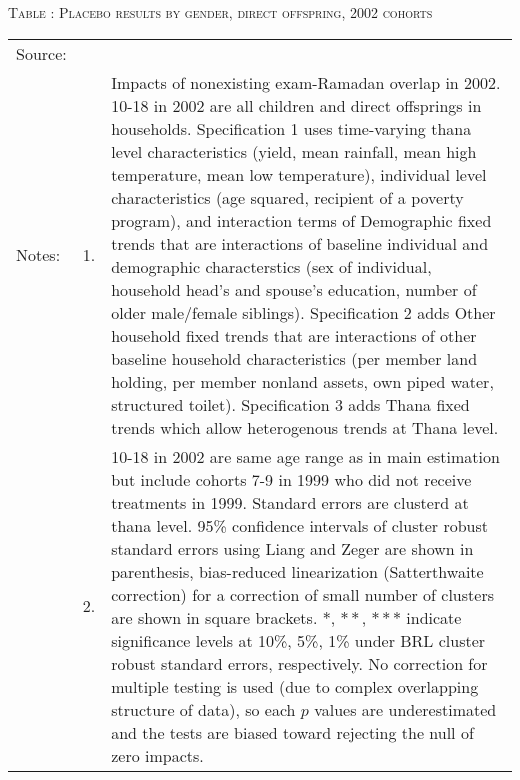 \begin{table}
\hfil\textsc{\footnotesize Table \thetable: Placebo results by gender, direct offspring, 2002 cohorts\label{PlaceboResultsDirect2002Table}}\\
\setlength{\tabcolsep}{1pt}
\renewcommand{\arraystretch}{.55}
\hspace{-1cm}

\renewcommand{\arraystretch}{1}
\hfil\begin{tabular}{>{\hfill\scriptsize}p{1cm}<{}>{\hfill\scriptsize}p{.5cm}<{}>{\scriptsize}p{12cm}<{\hfill}}
Source:& \multicolumn{2}{l}{\scriptsize Compiled from IFPRI data. Various cohorts.}\\[-1ex]
Notes:& 1. & Impacts of nonexisting exam-Ramadan overlap in 2002. \textsf{10-18 in 2002} are all children and direct offsprings in households. \textsf{Specification 1} uses time-varying thana level characteristics (yield, mean rainfall, mean high temperature, mean low temperature), individual level characteristics (age squared, recipient of a poverty program), and interaction terms of \textsf{Demographic fixed trends} that are interactions of baseline individual and demographic characterstics (sex of individual, household head's and spouse's education, number of older male/female siblings). \textsf{Specification 2} adds \textsf{Other household fixed trends} that are interactions of other baseline household characteristics (per member land holding, per member nonland assets, own piped water, structured toilet). \textsf{Specification 3} adds \textsf{Thana fixed trends} which allow heterogenous trends at Thana level. \\[-1ex]
& 2. & \textsf{10-18 in 2002} are same age range as in main estimation but include cohorts 7-9 in 1999 who did not receive treatments in 1999. Standard errors are clusterd at thana level. 95\% confidence intervals of cluster robust standard errors using Liang and Zeger are shown in parenthesis, bias-reduced linearization (Satterthwaite correction) for a correction of small number of clusters are shown in square brackets. $*$, $**$, $***$ indicate significance levels at 10\%, 5\%, 1\% under BRL cluster robust standard errors, respectively. No correction for multiple testing is used (due to complex overlapping structure of data), so each $p$ values are underestimated and the tests are biased toward rejecting the null of zero impacts. 
\end{tabular}
\end{table}


